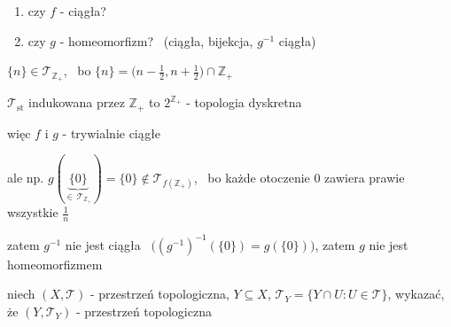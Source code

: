 \documentclass[a4paper,12pt]{article}
\begin{document}
\begin{podpunkty}
    \smallskip
    \begin{minipage}[c]{0.5\linewidth}
    \begin{enumerate}[label=\roman*), leftmargin=1.9em, itemsep=0.2em, topsep=0.2em, parsep=0pt, partopsep=0pt]
        \item czy \(f\) - ciągła?
        \item czy \(g\) - homeomorfizm? \, (ciągła, bijekcja, \(g^{-1}\) ciągła)
    \end{enumerate}
    \end{minipage}
    \hspace{1.5em}

    \smallskip
    \(\{n\} \in \mathcal{T}_{\mathbb{Z}_+}\), \, bo \(\{n\} = \big(n - \frac{1}{2}, n + \frac{1}{2}\big) \cap \mathbb{Z}_+\)

    \(\mathcal{T}_{\text{st}}\) indukowana przez \(\mathbb{Z}_+\) to \(2^{\mathbb{Z}_+}\) - topologia dyskretna

    więc \(f\) i \(g\) - trywialnie ciągłe

    ale np. \(g(\underbrace{\{0\}}_{\in \, \mathcal{T}_{\mathbb{Z}_+}}) = \{0\} \notin \mathcal{T}_{f(\mathbb{Z}_+)}\), \, bo każde otoczenie \(0\) zawiera prawie wszystkie \(\frac{1}{n}\)

    zatem \(g^{-1}\) nie jest ciągła \, \(\big((g^{-1})^{-1}(\{0\}) = g(\{0\})\big)\), \; zatem \(g\) nie jest homeomorfizmem
\end{podpunkty}

\bigskip
\zdc \; niech \((X, \mathcal{T})\) - przestrzeń topologiczna, \; \(Y \subseteq X\), \; \(\mathcal{T}_Y = \{Y \cap U : U \in \mathcal{T}\}\), \; wykazać, że \((Y, \mathcal{T}_Y)\) - przestrzeń topologiczna
\end{document}
